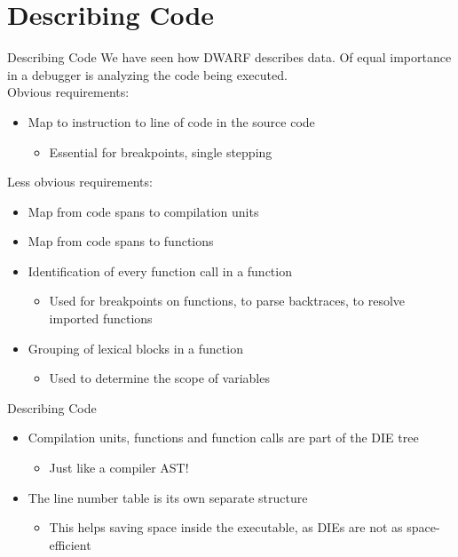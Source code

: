 
\section{Describing Code}


\begin{frame}{Describing Code}
We have seen how DWARF describes \alert{data}.
Of equal importance in a debugger is analyzing the \alert{code being executed}.\\
\medskip
Obvious requirements:\\
\begin{itemize}
\item Map to instruction to line of code in the source code
	\begin{itemize}
	\item Essential for breakpoints, single stepping
	\end{itemize}
\end{itemize}
\medskip
Less obvious requirements:
\begin{itemize}
\item Map from code spans to compilation units
\item Map from code spans to functions
\item Identification of every function call in a function
	\begin{itemize}
	\item Used for breakpoints on functions, to parse backtraces, to resolve imported functions
	\end{itemize}
\item Grouping of lexical blocks in a function
	\begin{itemize}
	\item Used to determine the scope of variables
	\end{itemize}
\end{itemize}
\end{frame}


\begin{frame}{Describing Code}
\begin{itemize}
\item Compilation units, functions and function calls are part of the DIE tree
	\begin{itemize}
	\item Just like a compiler AST!
	\end{itemize}
\medskip
\item The line number table is its own separate structure
	\begin{itemize}
	\item This helps saving space inside the executable, as DIEs are not as space-efficient
	\end{itemize}
\end{itemize}
\end{frame}


